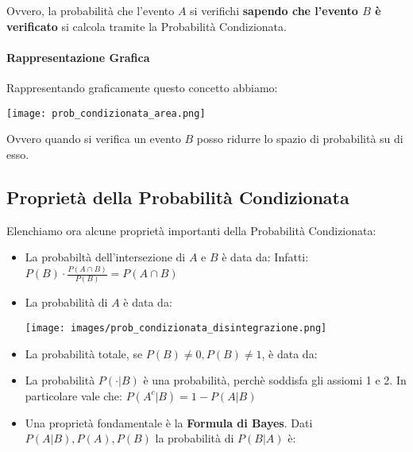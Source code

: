 Ovvero, la probabilità che l'evento $A$ si verifichi \textbf{sapendo che l'evento $B$ è verificato} si calcola tramite la Probabilità Condizionata.
\paragraph*{Rappresentazione Grafica} Rappresentando graficamente questo concetto abbiamo:
\begin{center}
    \texttt{[image: prob\_condizionata\_area.png]}    
\end{center}
Ovvero quando si verifica un evento $B$ posso ridurre lo spazio di probabilità su di esso.

\subsection{Proprietà della Probabilità Condizionata}
Elenchiamo ora alcune proprietà importanti della Probabilità Condizionata:
\begin{itemize}
    \item La probabiltà dell'intersezione di $A$ e $B$ è data da:
        Infatti:
        $P(B) \cdot \frac{P(A \cap B)}{P(B)} = P(A\cap B)$
    
    \item La probabilità di $A$ è data da:
        \begin{center}
            \texttt{[image: images/prob\_condizionata\_disintegrazione.png]}
        \end{center}
    \item La probabilità totale, se $P(B)\neq 0, P(B)\neq 1$, è data da:
    \item La probabilità $P(\cdot |B)$ è una probabilità, perchè soddisfa gli assiomi 1 e 2.
        In particolare vale che: $P(A^c|B) = 1 - P(A|B)$
    \item Una proprietà fondamentale è la \textbf{Formula di Bayes}. Dati $P(A|B), P(A),P(B)$ la probabilità di $P(B|A)$ è:

\end{itemize}

